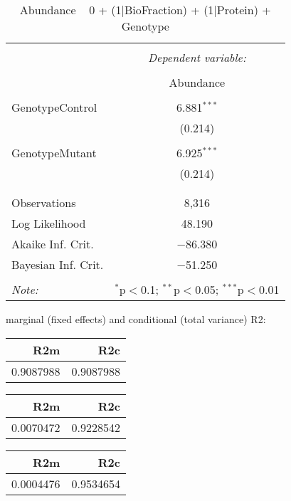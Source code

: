 \documentclass[11pt]{report}
\begin{document}
\begin{table}[!htbp] \centering 
  \caption{Abundance ~ 0 + (1|BioFraction) + (1|Protein) + Genotype} 
  \label{} 
\begin{tabular}{@{\extracolsep{5pt}}lc} 
\\[-1.8ex]\hline 
\hline \\[-1.8ex] 
 & \multicolumn{1}{c}{\textit{Dependent variable:}} \\ 
\cline{2-2} 
\\[-1.8ex] & Abundance \\ 
\hline \\[-1.8ex] 
 GenotypeControl & 6.881$^{***}$ \\ 
  & (0.214) \\ 
  & \\ 
 GenotypeMutant & 6.925$^{***}$ \\ 
  & (0.214) \\ 
  & \\ 
\hline \\[-1.8ex] 
Observations & 8,316 \\ 
Log Likelihood & 48.190 \\ 
Akaike Inf. Crit. & $-$86.380 \\ 
Bayesian Inf. Crit. & $-$51.250 \\ 
\hline 
\hline \\[-1.8ex] 
\textit{Note:}  & \multicolumn{1}{r}{$^{*}$p$<$0.1; $^{**}$p$<$0.05; $^{***}$p$<$0.01} \\ 
\end{tabular} 
\end{table} 
marginal (fixed effects) and conditional (total variance) R2:

\begin{tabular}{r|r}
\hline
R2m & R2c\\
\hline
0.9087988 & 0.9087988\\
\hline
\end{tabular}

\begin{tabular}{r|r}
\hline
R2m & R2c\\
\hline
0.0070472 & 0.9228542\\
\hline
\end{tabular}

\begin{tabular}{r|r}
\hline
R2m & R2c\\
\hline
0.0004476 & 0.9534654\\
\hline
\end{tabular}
\end{document}
